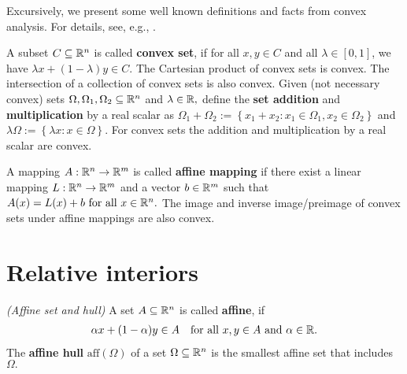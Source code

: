 Excursively, we present some well known definitions and facts from
convex analysis. For details, see, e.g., \cite{Mordukhovich2022}.

A subset $C\subseteq \mathbb{R}^n$ is called \textbf{convex set}, 
if for all $x,y\in C$ and all $\lambda\in [0,1]$,
we have 
$
  \lambda x + (1-\lambda)y 
  \in
  C
  .
$
The Cartesian product of convex sets is convex. The intersection of a collection of convex sets is also convex.
Given (not necessary convex) sets 
$
  \Omega,
  \Omega_1,
  \Omega_2
  \subseteq 
  \mathbb{R}^n
$
and
$\lambda\in\mathbb{R},$
define the \textbf{set addition} and \textbf{multiplication}
by a real scalar as 
$
  \Omega_1 
  +
  \Omega_2 
  :=
  \left\{ 
    x_1 + x_2 
    \colon
    x_1 \in \Omega_1
    ,
    x_2 \in \Omega_2
  \right\}
$
and
$
  \lambda \Omega
  :=
  \left\{ 
    \lambda x
    \colon
    x\in\Omega
  \right\}.
$
For convex sets the addition and multiplication by a real scalar are convex.


A mapping 
$
  A: \mathbb{R}^n \to \mathbb{R}^m
$
is called \textbf{affine mapping} if there exist a linear mapping
$
  L: \mathbb{R}^n \to \mathbb{R}^m
$
and a vector $b\in \mathbb{R}^m$
such that
$
  A(x)
  =
  L(x)
  +
  b
  \ 
  \text{for all}\ 
  x \in \R^n
  .
$
The image and inverse image/preimage of convex sets under affine mappings are also convex.

\section{Relative interiors}



\begin{definition}
  \emph{(Affine set and hull)}
  A set 
  $A\subseteq \mathbb{R}^n$
  is called \textbf{affine}, if
  \begin{gather}
    \alpha x + (1-\alpha)y \in A
    \quad
    \text{for all}
    \ 
    x,y \in A
    \ 
    \text{and}
    \ 
    \alpha \in \R.
  \end{gather}
  The \textbf{affine hull} 
  $\mathrm{aff}(\Omega)$
  of a set 
  $\Omega\subseteq \mathbb{R}^n$
  is the smallest affine set that includes $\Omega.$
\end{definition}

